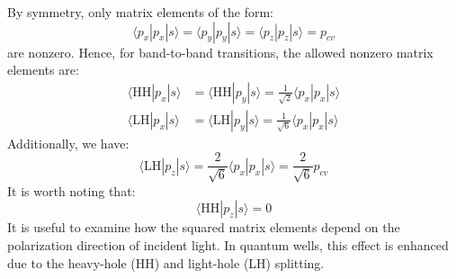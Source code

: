 By symmetry, only matrix elements of the form:
\begin{equation}
	\langle p_x | p_x | s \rangle = \langle p_y | p_y | s \rangle = \langle p_z | p_z | s \rangle = p_{cv}
\end{equation}
are nonzero. Hence, for band-to-band transitions, the allowed nonzero matrix elements are:
\begin{align}
	\langle \text{HH} | p_x | s \rangle & = \langle \text{HH} | p_y | s \rangle = \frac{1}{\sqrt{2}} \langle p_x | p_x | s \rangle \\
	\langle \text{LH} | p_x | s \rangle & = \langle \text{LH} | p_y | s \rangle = \frac{1}{\sqrt{6}} \langle p_x | p_x | s \rangle
\end{align}
Additionally, we have:
\begin{equation}
	\langle \text{LH} | p_z | s \rangle = \frac{2}{\sqrt{6}} \langle p_x | p_x | s \rangle = \frac{2}{\sqrt{6}} p_{cv}
\end{equation}
It is worth noting that:
\begin{equation}
	\langle \text{HH} | p_z | s \rangle = 0
\end{equation}
It is useful to examine how the squared matrix elements depend on the polarization direction of incident light. In quantum wells, this effect is enhanced due to the heavy-hole (HH) and light-hole (LH) splitting.

